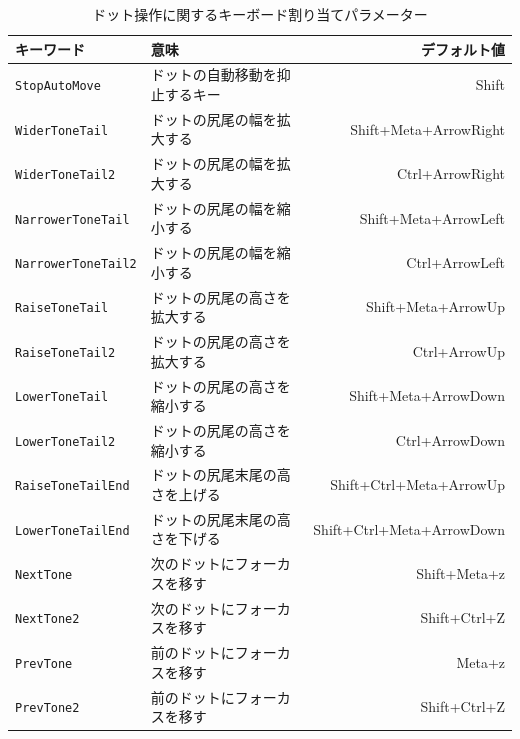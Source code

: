 \begin{table}[h]\label{DotOperationParameters}
	\centering
	\caption{ドット操作に関するキーボード割り当てパラメーター}
	\smallskip
	\begin{tabular}{llr}
	\hline
	キーワード & 意味 & デフォルト値\\
	\hline
	\hline
	\texttt{StopAutoMove} & ドットの自動移動を抑止するキー & Shift\\
	\hline
	\texttt{WiderToneTail} & ドットの尻尾の幅を拡大する
	 & Shift+Meta+ArrowRight\\
	\hline
	\texttt{WiderToneTail2} & ドットの尻尾の幅を拡大する
	 & Ctrl+ArrowRight\\
	\hline
	\texttt{NarrowerToneTail} & ドットの尻尾の幅を縮小する
	 & Shift+Meta+ArrowLeft\\
	\hline
	\texttt{NarrowerToneTail2} & ドットの尻尾の幅を縮小する
	 & Ctrl+ArrowLeft\\
	\hline
	\texttt{RaiseToneTail} & ドットの尻尾の高さを拡大する
	 & Shift+Meta+ArrowUp\\
	\hline
	\texttt{RaiseToneTail2} & ドットの尻尾の高さを拡大する
	 & Ctrl+ArrowUp\\
	\hline
	\texttt{LowerToneTail} & ドットの尻尾の高さを縮小する
	 & Shift+Meta+ArrowDown\\
	\hline
	\texttt{LowerToneTail2} & ドットの尻尾の高さを縮小する
	 & Ctrl+ArrowDown\\
	\hline
	\texttt{RaiseToneTailEnd} & ドットの尻尾末尾の高さを上げる
	 & Shift+Ctrl+Meta+ArrowUp\\
	\hline
	\texttt{LowerToneTailEnd} & ドットの尻尾末尾の高さを下げる
	 & Shift+Ctrl+Meta+ArrowDown\\
	\hline
	\texttt{NextTone} & 次のドットにフォーカスを移す
	 & Shift+Meta+z\\
	\hline
	\texttt{NextTone2} & 次のドットにフォーカスを移す
	 & Shift+Ctrl+Z\\
	\hline
	\texttt{PrevTone} & 前のドットにフォーカスを移す
	 & Meta+z\\
	\hline
	\texttt{PrevTone2} & 前のドットにフォーカスを移す
	 & Shift+Ctrl+Z\\
	\hline
	\end{tabular}
\end{table}


